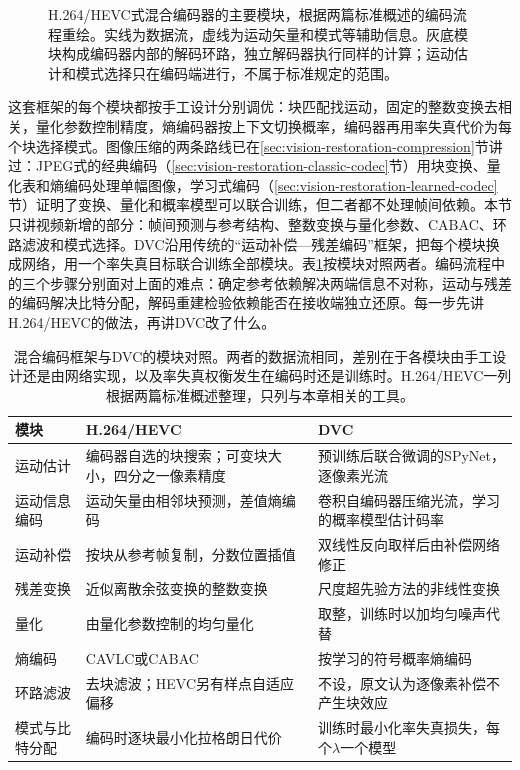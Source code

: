 \begin{figure}[tbp]
  \centering
  
  \caption{H.264/HEVC式混合编码器的主要模块，根据两篇标准概述的编码流程重绘。实线为数据流，虚线为运动矢量和模式等辅助信息。灰底模块构成编码器内部的解码环路，独立解码器执行同样的计算；运动估计和模式选择只在编码端进行，不属于标准规定的范围。}
  \label{fig:vision-video-hybrid-codec}
\end{figure}

这套框架的每个模块都按手工设计分别调优：块匹配找运动，固定的整数变换去相关，量化参数控制精度，熵编码器按上下文切换概率，编码器再用率失真代价为每个块选择模式。图像压缩的两条路线已在\ref{sec:vision-restoration-compression}节讲过：JPEG式的经典编码（\ref{sec:vision-restoration-classic-codec}节）用块变换、量化表和熵编码处理单幅图像，学习式编码（\ref{sec:vision-restoration-learned-codec}节）证明了变换、量化和概率模型可以联合训练，但二者都不处理帧间依赖。本节只讲视频新增的部分：帧间预测与参考结构、整数变换与量化参数、CABAC、环路滤波和模式选择。DVC沿用传统的“运动补偿—残差编码”框架，把每个模块换成网络，用一个率失真目标联合训练全部模块。表\ref{tab:vision-video-codec-modules}按模块对照两者。编码流程中的三个步骤分别面对上面的难点：确定参考依赖解决两端信息不对称，运动与残差的编码解决比特分配，解码重建检验依赖能否在接收端独立还原。每一步先讲H.264/HEVC的做法，再讲DVC改了什么。

\begin{table}[htbp]
  \centering
  \small
  \begin{tabularx}{\linewidth}{@{}lXX@{}}
    \toprule
    模块 & H.264/HEVC & DVC\\
    \midrule
    运动估计 & 编码器自选的块搜索；可变块大小，四分之一像素精度 & 预训练后联合微调的SPyNet，逐像素光流\\
    运动信息编码 & 运动矢量由相邻块预测，差值熵编码 & 卷积自编码器压缩光流，学习的概率模型估计码率\\
    运动补偿 & 按块从参考帧复制，分数位置插值 & 双线性反向取样后由补偿网络修正\\
    残差变换 & 近似离散余弦变换的整数变换 & 尺度超先验方法的非线性变换\\
    量化 & 由量化参数控制的均匀量化 & 取整，训练时以加均匀噪声代替\\
    熵编码 & CAVLC或CABAC & 按学习的符号概率熵编码\\
    环路滤波 & 去块滤波；HEVC另有样点自适应偏移 & 不设，原文认为逐像素补偿不产生块效应\\
    模式与比特分配 & 编码时逐块最小化拉格朗日代价 & 训练时最小化率失真损失，每个$\lambda$一个模型\\
    \bottomrule
  \end{tabularx}
  \caption{混合编码框架与DVC的模块对照。两者的数据流相同，差别在于各模块由手工设计还是由网络实现，以及率失真权衡发生在编码时还是训练时。H.264/HEVC一列根据两篇标准概述整理，只列与本章相关的工具。}
  \label{tab:vision-video-codec-modules}
\end{table}

